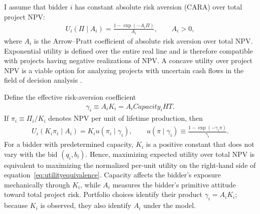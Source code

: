 \documentclass[10pt]{article}
\theoremstyle{plain}
\theoremstyle{definition}
\begin{document}
I assume that bidder $i$ has constant absolute risk aversion (CARA) over total
project NPV:
\begin{align*}
U_i(\Pi\mid A_i)
=\frac{1-\exp(-A_i\Pi)}{A_i},
\qquad A_i>0,
\end{align*}
where $A_i$ is the Arrow--Pratt coefficient of absolute risk aversion over
total NPV. Exponential utility is defined over the entire real line and is
therefore compatible with projects having negative realizations of NPV. A
concave utility over project NPV is a viable option for analyzing projects
with uncertain cash flows in the field of decision analysis
\citep{Hazen2009}.

Define the effective risk-aversion coefficient
\begin{align}
\label{eq:effectivegamma}
\gamma_i\equiv A_iK_i=A_iCapacity_iHT.
\end{align}
If $\pi_i\equiv\Pi_i/K_i$ denotes NPV per unit of lifetime production, then
\begin{align}
\label{eq:utilityequivalence}
U_i(K_i\pi_i\mid A_i)
=K_i u(\pi_i\mid\gamma_i),
\qquad
u(\pi\mid\gamma_i)
\equiv\frac{1-\exp(-\gamma_i\pi)}{\gamma_i}.
\end{align}
For a bidder with predetermined capacity, $K_i$ is a positive constant that
does not vary with the bid $(q_i,b_i)$. Hence, maximizing expected utility over
total NPV is equivalent to maximizing the normalized per-unit utility on the
right-hand side of equation~\eqref{eq:utilityequivalence}. Capacity affects
the bidder's exposure mechanically through $K_i$, while $A_i$ measures the
bidder's primitive attitude toward total project risk. Portfolio choices
identify their product $\gamma_i=A_iK_i$; because $K_i$ is observed, they also
identify $A_i$ under the model.
\end{document}
